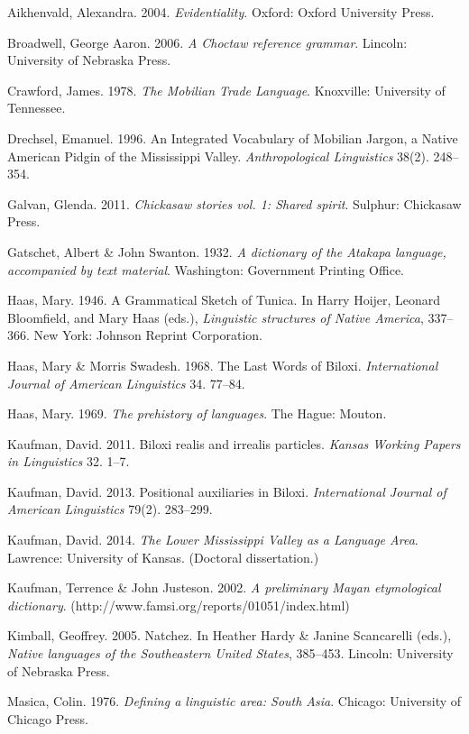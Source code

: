 \documentclass[output=paper]{LSP/langsci}
\begin{document}
\begin{reflist}

Aikhenvald, Alexandra. 2004. \emph{Evidentiality}. Oxford: Oxford University Press.

Broadwell, George Aaron. 2006. \emph{A Choctaw reference grammar}. Lincoln: University of Nebraska Press.

Crawford, James. 1978. \emph{The Mobilian Trade Language}. Knoxville: University of Tennessee.

Drechsel, Emanuel. 1996. An Integrated Vocabulary of Mobilian Jargon, a Native American Pidgin of the Mississippi Valley. \emph{Anthropological Linguistics} 38(2). 248--354.

Galvan, Glenda. 2011. \emph{Chickasaw stories vol. 1: Shared spirit}. Sulphur: Chickasaw Press.

Gatschet, Albert \& John Swanton. 1932. \emph{A dictionary of the Atakapa language, accompanied by text material}. Washington: Government Printing Office.

Haas, Mary. 1946. A Grammatical Sketch of Tunica. In Harry Hoijer, Leonard Bloomfield, and Mary Haas (eds.), \emph{Linguistic structures of Native America}, 337--366. New York: Johnson Reprint Corporation.

Haas, Mary \& Morris Swadesh. 1968. The Last Words of Biloxi. \emph{International Journal of American Linguistics} 34. 77--84.

Haas, Mary. 1969. \emph{The prehistory of languages}. The Hague: Mouton.

Kaufman, David. 2011. Biloxi realis and irrealis particles. \emph{Kansas Working Papers in Linguistics} 32. 1--7.

Kaufman, David. 2013. Positional auxiliaries in Biloxi. \emph{International Journal of American Linguistics} 79(2). 283--299.

Kaufman, David. 2014. \emph{The Lower Mississippi Valley as a Language Area}. Lawrence: University of Kansas. (Doctoral dissertation.)

Kaufman, Terrence \& John Justeson. 2002. \emph{A preliminary Mayan etymological dictionary}. (http://www.famsi.org/reports/01051/index.html)

Kimball, Geoffrey. 2005. Natchez. In Heather Hardy \& Janine Scancarelli (eds.), \emph{Native languages of the Southeastern United States}, 385--453. Lincoln: University of Nebraska Press.

Masica, Colin. 1976. \emph{Defining a linguistic area: South Asia}. Chicago: University of Chicago Press.


\end{reflist}
\end{document}
